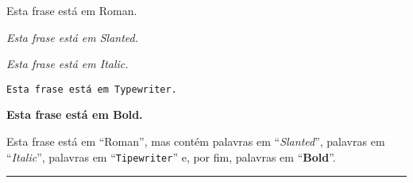 {\rm Esta frase est\'a em Roman.}

{\sl Esta frase est\'a em Slanted.}

{\it Esta frase est\'a em Italic.}

{\tt Esta frase est\'a em Typewriter.}

{\bf Esta frase est\'a em Bold.}

\noindent
Esta frase est\'a em ``Roman'', mas cont\'em palavras em ``{\sl Slanted\/}'',
palavras em ``{\it Italic\/}'', palavras em ``{\tt Tipewriter\/}'' e, por fim,
palavras em ``{\bf Bold\/}''.

\vskip 1in
\hrule
\vfill\eject

